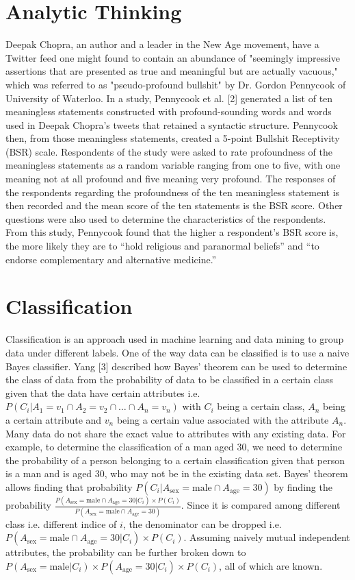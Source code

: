 \documentclass[conference]{IEEEtran}
\begin{document}
\section{Analytic Thinking}
Deepak Chopra, an author and a leader in the New Age movement, have a Twitter feed one might found to contain an abundance of "seemingly impressive assertions that are presented as true and meaningful but are actually vacuous," which was referred to as "pseudo-profound bullshit" by Dr. Gordon Pennycook of University of Waterloo. 
In a study, Pennycook et al. [2] generated a list of ten meaningless statements constructed with profound-sounding words and words used in Deepak Chopra's tweets that retained a syntactic structure. 
Pennycook then, from those meaningless statements, created a 5-point Bullshit Receptivity (BSR) scale.
Respondents of the study were asked to rate profoundness of the meaningless statements as a random variable ranging from one to five, with one meaning not at all profound and five meaning very profound.
The responses of the respondents regarding the profoundness of the ten meaningless statement is then recorded and the mean score of the ten statements is the BSR score.
Other questions were also used to determine the characteristics of the respondents.
From this study, Pennycook found that the higher a respondent's BSR score is, the more likely they are to ``hold religious and paranormal beliefs'' and ``to endorse complementary and alternative medicine.''

\section{Classification}
Classification is an approach used in machine learning and data mining to group data under different labels.
One of the way data can be classified is to use a naive Bayes classifier. 
Yang [3] described how Bayes' theorem can be used to determine the class of data from the probability of data to be classified in a certain class given that the data have certain attributes i.e. $P(C_i|A_1=v_1\cap A_2=v_2\cap \dots \cap A_n = v_n)$ with $C_i$ being a certain class, $A_n$ being a certain attribute and $v_n$ being a certain value associated with the attribute $A_n$.
Many data do not share the exact value to attributes with any existing data. For example, to determine the classification of a man aged 30, we need to determine the probability of a person belonging to a certain classification given that person is a man and is aged 30, who may not be in the existing data set.
Bayes' theorem allows finding that probability $P(C_i|A_{\text{sex}}=\text{male}\cap A_{\text{age}}=30)$ by finding the probability $\frac{P(A_{\text{sex}}=\text{male}\cap A_{\text{age}}=30|C_i)\times P(C_i)}{P(A_{\text{sex}}=\text{male}\cap A_{\text{age}}=30)}$. Since it is compared among different class i.e. different indice of $i$, the denominator can be dropped i.e. $P(A_{\text{sex}}=\text{male}\cap A_{\text{age}}=30|C_i)\times P(C_i)$.
Assuming naively mutual independent attributes, the probability can be further broken down to $P(A_{\text{sex}}=\text{male}|C_i)\times P(A_{\text{age}}=30|C_i) \times P(C_i)$, all of which are known.
\end{document}
